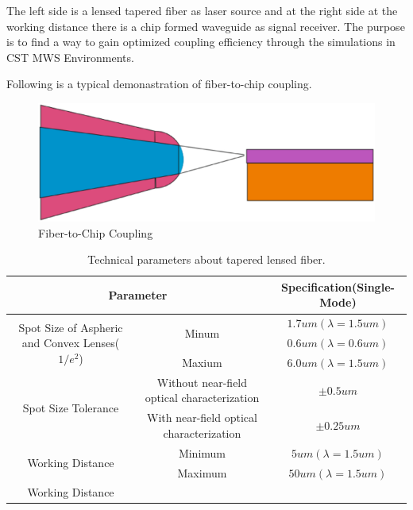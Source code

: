 The left side is a lensed tapered fiber as laser source and at the right side at the working distance there is a chip formed waveguide as signal receiver.  The purpose is to find a way to gain optimized coupling efficiency through the simulations in CST MWS Environments. 


Following is a typical demonastration of fiber-to-chip coupling.
\begin{figure}
\includegraphics[width=.7\textwidth]{bilder/experiment_object}
\caption{Fiber-to-Chip Coupling}
\label{experiment_object}
\end{figure}

\begin{table}
\begin{tabular}{c|c|c}
\hline
\multicolumn{2}{|c|}{\textbf{Parameter}}&\textbf{Specification(Single-Mode)}\\
\hline
\multirow{3}{*}{Spot Size of Aspheric and Convex Lenses($1/e^2$)}&\multirow{2}{*}{Minum}&$1.7um(\lambda=1.5um)$\\
&																		 &$0.6um(\lambda=0.6um)$\\
&Maxium															 &$6.0um(\lambda=1.5um)$\\
\hline
\multirow{2}{*}{Spot Size Tolerance}&Without near-field optical characterization &$\pm 0.5um$\\
&With near-field optical characterization &$\pm 0.25um$\\
\hline
\multirow{2}{*}{Working Distance} &Minimum &$5um(\lambda=1.5um)$\\
&																	Maximum &$50um(\lambda=1.5um)$\\
\hline
	

Working Distance&
\end {tabular}
\caption{Technical parameters about tapered lensed fiber.\cite{nanoscal_tapered_fiber}}
\label{technical parameters}
\end{table}
